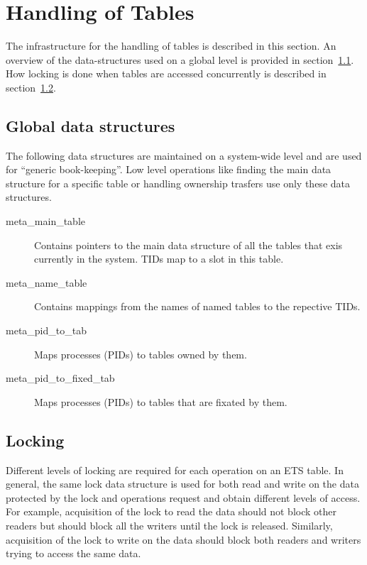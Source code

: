\documentclass[aps,pre,preprint,nofootinbib]{revtex4}
\begin{document}
\section{Handling of Tables}

The infrastructure for the handling of tables is described in this section. 
An overview of the data-structures used on a global level is provided in section~\ref{sec:tables_overview}.
How locking is done when tables are accessed concurrently is described in section~\ref{sec:tables_locking}.

\subsection{Global data structures}
\label{sec:tables_overview}

The following data structures are maintained on a system-wide level and are used for ``generic book-keeping''.
Low level operations like finding the main data structure for a specific table or handling ownership trasfers use only these data structures.

\begin{description}
\item[meta\_main\_table]
  Contains pointers to the main data structure of all the tables that exis currently in the system.
  TIDs map to a slot in this table.
\item[meta\_name\_table]
  Contains mappings from the names of named tables to the repective TIDs.
\item[meta\_pid\_to\_tab]
  Maps processes (PIDs) to tables owned by them.
\item[meta\_pid\_to\_fixed\_tab]
  Maps processes (PIDs) to tables that are fixated by them.
\end{description}

\subsection{Locking} \label{sec:tables_locking}

Different levels of locking are required for each operation on an ETS table.
In general, the same lock data structure is used for both read and write on the data protected by the lock and operations request and obtain different levels of access.
For example, acquisition of the lock to read the data should not block other readers but should block all the writers until the lock is released.
Similarly, acquisition of the lock to write on the data should block both readers and writers trying to access the same data.
\end{document}
